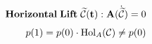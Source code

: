 \documentclass[preview]{standalone}
\begin{document}
\begin{align*}
\special{dvisvgm:raw <g id='unique000'>}\mathbf{Horizontal\;Lift\;\widetilde{\mathcal{C}}(t):}\;\mathbf{A}(\dot{\widetilde{\mathcal{C}}}) = 0\\[4pt]p(1) = p(0)\cdot\operatorname{Hol}_A(\mathcal{C}) \neq p(0)\special{dvisvgm:raw </g>}
\end{align*}
\end{document}

